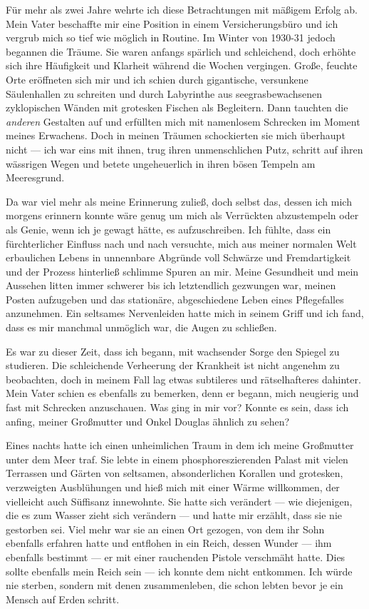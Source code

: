 Für mehr als zwei Jahre wehrte ich diese Betrachtungen mit mäßigem Erfolg ab. Mein Vater beschaffte mir eine Position in einem Versicherungsbüro und ich vergrub mich so tief wie möglich in Routine. Im Winter von 1930-31 jedoch begannen die Träume. Sie waren anfangs spärlich und schleichend, doch erhöhte sich ihre Häufigkeit und Klarheit während die Wochen vergingen. Große, feuchte Orte eröffneten sich mir und ich schien durch gigantische, versunkene Säulenhallen zu schreiten und durch Labyrinthe aus seegrasbewachsenen zyklopischen Wänden mit grotesken Fischen als Begleitern. Dann tauchten die \textit{anderen}  Gestalten auf und erfüllten mich mit namenlosem Schrecken im Moment meines Erwachens. Doch in meinen Träumen schockierten sie mich überhaupt nicht --- ich war eins mit ihnen, trug ihren unmenschlichen Putz, schritt auf ihren wässrigen Wegen und betete ungeheuerlich in ihren bösen Tempeln am Meeresgrund.

Da war viel mehr als meine Erinnerung zuließ, doch selbst das, dessen ich mich morgens erinnern konnte wäre genug um mich als Verrückten abzustempeln oder als Genie, wenn ich je gewagt hätte, es aufzuschreiben. Ich fühlte, dass ein fürchterlicher Einfluss nach und nach versuchte, mich aus meiner normalen Welt erbaulichen Lebens in unnennbare Abgründe voll Schwärze und Fremdartigkeit und der Prozess hinterließ schlimme Spuren an mir. Meine Gesundheit und mein Aussehen litten immer schwerer bis ich letztendlich gezwungen war, meinen Posten aufzugeben und das stationäre, abgeschiedene Leben eines Pflegefalles anzunehmen. Ein seltsames Nervenleiden hatte mich in seinem Griff und ich fand, dass es mir manchmal unmöglich war, die Augen zu schließen.

Es war zu dieser Zeit, dass ich begann, mit wachsender Sorge den Spiegel zu studieren. Die schleichende Verheerung der Krankheit ist nicht angenehm zu beobachten, doch in meinem Fall lag etwas subtileres und rätselhafteres dahinter. Mein Vater schien es ebenfalls zu bemerken, denn er begann, mich neugierig und fast mit Schrecken anzuschauen. Was ging in mir vor? Konnte es sein, dass ich anfing, meiner Großmutter und Onkel Douglas ähnlich zu sehen?

Eines nachts hatte ich einen unheimlichen Traum in dem ich meine Großmutter unter dem Meer traf. Sie lebte in einem phosphoreszierenden Palast mit vielen Terrassen und Gärten von seltsamen, absonderlichen Korallen und grotesken, verzweigten Ausblühungen und hieß mich mit einer Wärme willkommen, der vielleicht auch Süffisanz innewohnte. Sie hatte sich verändert --- wie diejenigen, die es zum Wasser zieht sich verändern --- und hatte mir erzählt, dass sie nie gestorben sei. Viel mehr war sie an einen Ort gezogen, von dem ihr Sohn ebenfalls erfahren hatte und entflohen in ein Reich, dessen Wunder --- ihm ebenfalls bestimmt --- er mit einer rauchenden Pistole verschmäht hatte. Dies sollte ebenfalls mein Reich sein --- ich konnte dem nicht entkommen. Ich würde nie sterben, sondern mit denen zusammenleben, die schon lebten bevor je ein Mensch auf Erden schritt.

